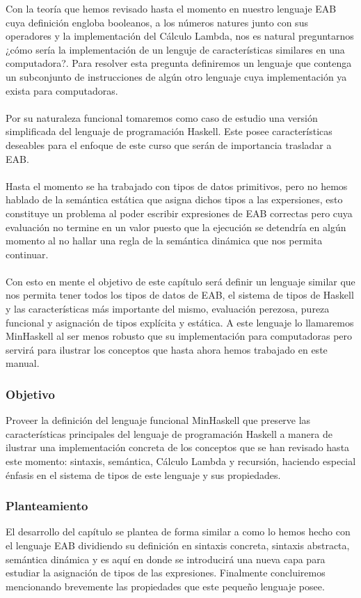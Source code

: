 Con la teoría que hemos revisado hasta el momento en nuestro lenguaje \textsf{EAB} cuya definición engloba booleanos, a los números natures junto con sus operadores y la implementación del Cálculo Lambda, nos es natural preguntarnos  ¿cómo sería la implementación de un lenguje de características similares en una computadora?. Para resolver esta pregunta definiremos un lenguaje que contenga un subconjunto de instrucciones de algún otro lenguaje cuya implementación ya exista para computadoras.  \\\\
Por su naturaleza funcional tomaremos como caso de estudio una versión simplificada del lenguaje de programación \textsf{Haskell}. Este posee características deseables para el enfoque de este curso que serán de importancia trasladar a \textsf{EAB}. \\\\
Hasta el momento se ha trabajado con tipos de datos primitivos, pero no hemos hablado de la semántica estática que asigna dichos tipos a las expersiones, esto constituye un problema al poder escribir expresiones de \textsf{EAB} correctas pero cuya evaluación no termine en un valor puesto que la ejecución se detendría en algún momento al no hallar una regla de la semántica dinámica que nos permita continuar. \\\\
Con esto en mente el objetivo de este capítulo será definir un lenguaje similar que nos permita tener todos los tipos de datos de \textsf{EAB}, el sistema de tipos de \textsf{Haskell} y las características más importante del mismo, evaluación perezosa, pureza funcional y asignación de tipos explícita y estática. 
A este lenguaje lo llamaremos \textsf{MinHaskell} al ser menos robusto que su implementación para computadoras pero servirá para ilustrar los conceptos que hasta ahora hemos trabajado en este manual.

\subsubsection{Objetivo}
Proveer la definición del lenguaje funcional \textsf{MinHaskell} que preserve las características principales del lenguaje de programación \textsf{Haskell} a manera de ilustrar una implementación concreta de los conceptos que se han revisado hasta este momento: sintaxis, semántica, Cálculo Lambda y recursión, haciendo especial énfasis en el sistema de tipos de este lenguaje y sus propiedades.


\subsubsection{Planteamiento}
El desarrollo del capítulo se plantea de forma similar a como lo hemos hecho con el lenguaje \textsf{EAB} dividiendo su definición en sintaxis concreta, sintaxis abstracta, semántica dinámica y es aquí en donde se introducirá una nueva capa para estudiar la asignación de tipos de las expresiones. Finalmente concluiremos mencionando brevemente las propiedades que este pequeño lenguaje posee. \\

